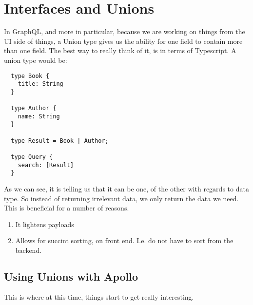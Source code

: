 \maketitle{}
\section{ Interfaces and Unions }

In GraphQL, and more in particular, because we are working on things from the
UI side of things, a Union type gives us the ability for one field to contain
more than one field. The best way to really think of it, is in terms of
Typescript. A union type would be:
\begin{lstlisting}
  type Book {
    title: String
  }

  type Author {
    name: String
  }

  type Result = Book | Author;

  type Query {
    search: [Result]
  }
\end{lstlisting}

As we can see, it is telling us that it can be one, of the other with regards
to data type. So instead of returning irrelevant data, we only return the data
we need. This is beneficial for a number of reasons.
\begin{enumerate}
  \item It lightens payloads
  \item Allows for succint sorting, on front end. I.e. do not have to sort from
  the backend.
\end{enumerate}

\subsection{ Using Unions with Apollo }
This is where at this time, things start to get really interesting. 
